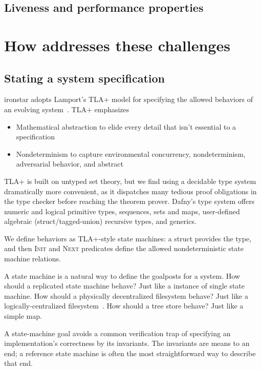 \subsection{Liveness and performance properties}

\section{How {\ironstar} addresses these challenges}

\subsection{Stating a system specification}\label{sec:specification}

{ironstar} adopts Lamport's TLA+ model for specifying the
allowed behaviors of an evolving system~\cite{specifying-systems}.
TLA+ emphasizes
\begin{itemize}
\item Mathematical abstraction to elide every detail that isn't
  essential to a specification
\item Nondeterminism to capture environmental concurrency,
  nondeterminism, adversarial behavior, and abstract 
\end{itemize}

TLA+ is built on untyped set theory, but we find using a
decidable type system dramatically more convenient,
as it dispatches many tedious proof obligations in the type checker before
reaching the theorem prover.
Dafny's type system offers numeric and logical primitive types,
sequences, sets and maps, user-defined
algebraic (struct/tagged-union) recursive types, and generics.

We define behaviors as TLA+-style state machines:
a struct provides the  type, and
then \textsc{Init} and \textsc{Next} predicates define
the allowed nondeterministic state machine relations.

A state machine is a natural way to define the goalposts for a system.
How should a replicated state machine behave?
Just like a instance of single state machine.
How should a physically decentralized filesystem behave?
Just like a logically-centralized filesystem~\cite{Farsite}.
How should a {\bepsilon}tree store behave?
Just like a simple map.

A state-machine goal avoids a common verification trap of specifying
an implementation's correctness by its invariants. The invariants are
means to an end; a reference state machine is often the most straightforward
way to describe that end.

